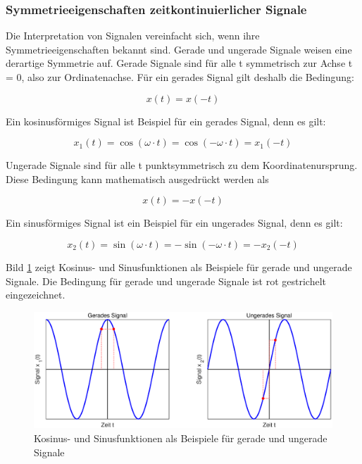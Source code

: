 \subsubsection{ Symmetrieeigenschaften zeitkontinuierlicher Signale}

\noindent Die Interpretation von Signalen vereinfacht sich, wenn ihre Symmetrieeigenschaften bekannt sind. Gerade und ungerade Signale weisen eine derartige Symmetrie auf. Gerade Signale sind f\"{u}r alle t symmetrisch zur Achse t = 0, also zur Ordinatenachse. F\"{u}r ein gerades Signal gilt deshalb die Bedingung: 

\begin{equation}\label{eq:onesixteen}
x(t)=x(-t)
\end{equation}


\noindent Ein kosinusf\"{o}rmiges Signal ist Beispiel f\"{u}r ein gerades Signal, denn es gilt:

\begin{equation}\label{eq:oneseventeen}
x_{1} \left(t\right)=\cos \left(\omega \cdot t\right)=\cos \left(-\omega \cdot t\right)=x_{1} \left(-t\right)
\end{equation}

\noindent Ungerade Signale sind f\"{u}r alle t punktsymmetrisch zu dem Koordinatenursprung. Diese Bedingung kann mathematisch ausgedr\"{u}ckt werden als

\begin{equation}\label{eq:oneeighteen}
x\left(t\right)=-x\left(-t\right)
\end{equation}

\noindent Ein sinusf\"{o}rmiges Signal ist ein Beispiel f\"{u}r ein ungerades Signal, denn es gilt:

\begin{equation}\label{eq:onenineteen}
x_{2} \left(t\right)=\sin \left(\omega \cdot t\right)=-\sin \left(-\omega \cdot t\right)=-x_{2} \left(-t\right)
\end{equation}


\noindent Bild \ref{fig:SymmetrieSinusKosinus} zeigt Kosinus- und Sinusfunktionen als Beispiele f\"{u}r gerade und ungerade Signale. Die Bedingung f\"{u}r gerade und ungerade Signale ist rot gestrichelt eingezeichnet.
\clearpage

\begin{figure}[H]
  \includegraphics[width=1\textwidth]{Kapitel1/Bilder/image4}
  \caption{Kosinus- und Sinusfunktionen als Beispiele f\"{u}r gerade und ungerade Signale}
  \label{fig:SymmetrieSinusKosinus}
\end{figure}

